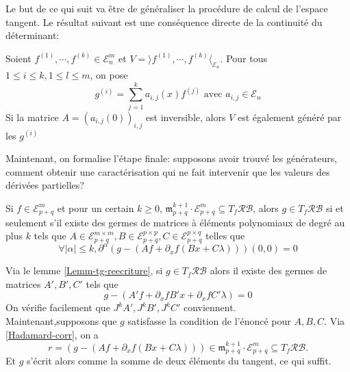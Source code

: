 \documentclass[memoire.tex]{subfiles}
\begin{document}
Le but de ce qui suit va être de généraliser 
la procédure de calcul de l'espace tangent. Le résultat 
suivant est une conséquence directe de la continuité du déterminant:
\begin{lemme}
    Soient 
    $f^{(1)},\cdots,f^{(k)}\in\mathcal{E} ^m_n$  et $V=\rangle f^{(1)},\cdots,f^{(k)}\langle_{\mathcal{E}_n}$. Pour tous $1\leq i\leq k,1\leq l\leq m$, on pose
    \begin{equation*}
        g^{(i)}=\sum_{j=1}^{k}a_{i,j}(x)f^{(j)}\text{ avec }a_{i,j}\in\mathcal{E}_n
    \end{equation*}
Si la matrice $A=(a_{i,j}(0))_{i,j}$ est inversible, alors $V$ est également généré par les $g^{(i)}$
\end{lemme}
Maintenant, on formalise l'étape finale: 
supposons avoir trouvé les générateurs, 
comment obtenir une caractérisation qui ne 
fait intervenir que les valeurs des dérivées 
partielles?

\begin{lemme}
    Si $f\in\mathcal{E}^m_{p+q}$ et pour un certain $k\geq 0$, $\mathfrak{m}^{k+1}_{p+q}\cdot \mathcal{E}^m_{p+q}\subseteq T_f\mathcal{RB}$, alors $g\in T_f\mathcal{RB} $ si et seulement s'il existe des germes de matrices à éléments polynomiaux de  degré au plus $k$ tels que
    $A\in\mathcal{E}^{m\times m}_{p+q},
    B\in\mathcal{E}^{p\times p}_{p+q},C \in\mathcal{E}^{p\times q}_{p+q}$ telles que
    \begin{equation*}
        \forall |\alpha|\leq k,
        \partial^{\alpha}\left( g- \left( Af+\partial_x f(B x+ C\lambda) \right)\right)(0,0)=0
    \end{equation*}
\end{lemme}
\begin{preuve}
    Via le lemme \ref{Lemm-tg-reecriture}, si $g\in T_f\mathcal{RB}$ alors il existe des germes de matrices $A',B',C'$ tels que
    \begin{equation*}
        g-(A'f+\partial_x fB'x+ \partial_x fC'\lambda)=0
    \end{equation*}
    On vérifie facilement que $J^k A',J^kB', J^k C'$ conviennent.\\
    Maintenant,supposons que $g$ satisfasse la condition de l'énoncé pour $A,B,C$. Via \eqref{Hadamard-corr}, on a 
    \begin{equation*}
        r=\left( g- \left( Af+\partial_x f(B x+ 
         C\lambda) \right)
        \right)\in\mathfrak{m}^{k+1}_{p+q}\cdot\mathcal{E}^m_{p+q}\subseteq T_f\mathcal{RB}.         
    \end{equation*}
    Et $g$ s'écrit alors comme la somme de deux éléments du tangent, ce qui suffit.
\end{preuve}
\end{document}
